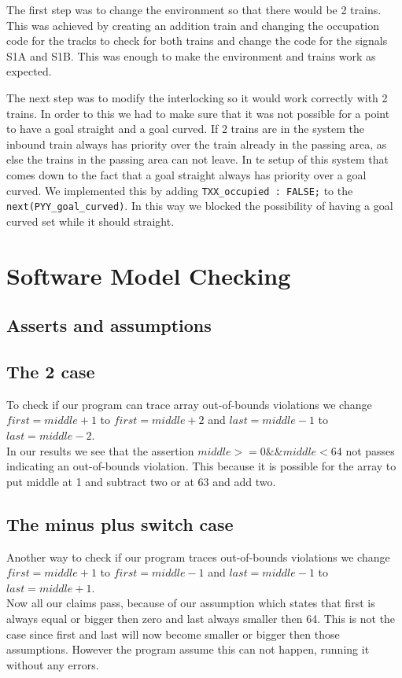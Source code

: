 \documentclass[a4paper]{article}
\begin{document}
	The first step was to change the environment so that there would be 2 trains. This was achieved by creating an addition train and changing the occupation code for the tracks to check for both trains and change the code for the signals S1A and S1B. This was enough to make the environment and trains work as expected.
	
	The next step was to modify the interlocking so it would work correctly with 2 trains.
	In  order to this we had to make sure that it was not possible for a point to have a goal straight and a goal curved. If 2 trains are in the system the inbound train always has priority over the train already in the passing area, as else the trains in the passing area can not leave. In te setup of this system that comes down to the fact that a goal straight always has priority over a goal curved. We implemented this by adding \texttt{TXX\_occupied : FALSE;} to the \texttt{next(PYY\_goal\_curved)}. In this way we blocked the possibility of having a goal curved set while it should straight.
	
	\section{Software Model Checking}
	
	
	\subsection{Asserts and assumptions}
	
	
	\subsection{The 2 case}
	To check if our program can trace array out-of-bounds violations we change  $first = middle +1$ to $first = middle + 2$ and $last = middle - 1$ to $last = middle - 2$. \\
	In our results we see that the assertion $middle >= 0  \&\&  middle < 64$ not passes indicating an out-of-bounds violation. This because it is possible for the array to put middle at 1 and subtract two or at 63 and add two.
	
	
	\subsection{The minus plus switch case}
	Another way to check if our program traces out-of-bounds violations we change $first = middle +1$ to $first = middle - 1$ and $last = middle - 1$ to $last = middle + 1$.\\
	Now all our claims pass, because of our assumption which states that first is always equal or bigger then zero and last always smaller then 64. This is not the case since first and last will now become smaller or bigger then those assumptions. However the program assume this can not happen, running it without any errors.
	
	
\end{document}
